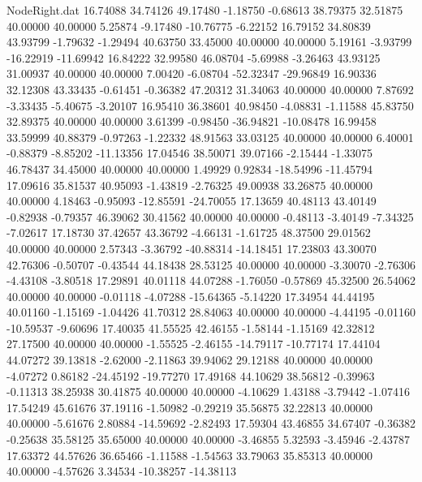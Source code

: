 \begin{filecontents}{NodeRight.dat}
  16.74088   34.74126   49.17480    -1.18750   -0.68613   38.79375   32.51875   40.00000   40.00000    5.25874   -9.17480  -10.76775   -6.22152
  16.79152   34.80839   43.93799    -1.79632   -1.29494   40.63750   33.45000   40.00000   40.00000    5.19161   -3.93799  -16.22919  -11.69942
  16.84222   32.99580   46.08704    -5.69988   -3.26463   43.93125   31.00937   40.00000   40.00000    7.00420   -6.08704  -52.32347  -29.96849
  16.90336   32.12308   43.33435    -0.61451   -0.36382   47.20312   31.34063   40.00000   40.00000    7.87692   -3.33435   -5.40675   -3.20107
  16.95410   36.38601   40.98450    -4.08831   -1.11588   45.83750   32.89375   40.00000   40.00000    3.61399   -0.98450  -36.94821  -10.08478
  16.99458   33.59999   40.88379    -0.97263   -1.22332   48.91563   33.03125   40.00000   40.00000    6.40001   -0.88379   -8.85202  -11.13356
  17.04546   38.50071   39.07166    -2.15444   -1.33075   46.78437   34.45000   40.00000   40.00000    1.49929    0.92834  -18.54996  -11.45794
  17.09616   35.81537   40.95093    -1.43819   -2.76325   49.00938   33.26875   40.00000   40.00000    4.18463   -0.95093  -12.85591  -24.70055
  17.13659   40.48113   43.40149    -0.82938   -0.79357   46.39062   30.41562   40.00000   40.00000   -0.48113   -3.40149   -7.34325   -7.02617
  17.18730   37.42657   43.36792    -4.66131   -1.61725   48.37500   29.01562   40.00000   40.00000    2.57343   -3.36792  -40.88314  -14.18451
  17.23803   43.30070   42.76306    -0.50707   -0.43544   44.18438   28.53125   40.00000   40.00000   -3.30070   -2.76306   -4.43108   -3.80518
  17.29891   40.01118   44.07288    -1.76050   -0.57869   45.32500   26.54062   40.00000   40.00000   -0.01118   -4.07288  -15.64365   -5.14220
  17.34954   44.44195   40.01160    -1.15169   -1.04426   41.70312   28.84063   40.00000   40.00000   -4.44195   -0.01160  -10.59537   -9.60696
  17.40035   41.55525   42.46155    -1.58144   -1.15169   42.32812   27.17500   40.00000   40.00000   -1.55525   -2.46155  -14.79117  -10.77174
  17.44104   44.07272   39.13818    -2.62000   -2.11863   39.94062   29.12188   40.00000   40.00000   -4.07272    0.86182  -24.45192  -19.77270
  17.49168   44.10629   38.56812    -0.39963   -0.11313   38.25938   30.41875   40.00000   40.00000   -4.10629    1.43188   -3.79442   -1.07416
  17.54249   45.61676   37.19116    -1.50982   -0.29219   35.56875   32.22813   40.00000   40.00000   -5.61676    2.80884  -14.59692   -2.82493
  17.59304   43.46855   34.67407    -0.36382   -0.25638   35.58125   35.65000   40.00000   40.00000   -3.46855    5.32593   -3.45946   -2.43787
  17.63372   44.57626   36.65466    -1.11588   -1.54563   33.79063   35.85313   40.00000   40.00000   -4.57626    3.34534  -10.38257  -14.38113

\end{filecontents}
